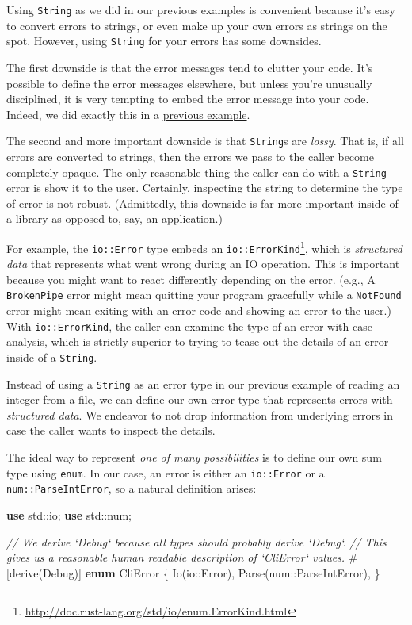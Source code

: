 \documentclass[a4paper,]{book}
\newenvironment{Shaded}{\begin{snugshade}}{\end{snugshade}}
\newcommand{\KeywordTok}[1]{\textcolor[rgb]{0.13,0.29,0.53}{\textbf{{#1}}}}
\newcommand{\CommentTok}[1]{\textcolor[rgb]{0.56,0.35,0.01}{\textit{{#1}}}}
\newcommand{\BuiltInTok}[1]{{#1}}
\newcommand{\AttributeTok}[1]{\textcolor[rgb]{0.77,0.63,0.00}{{#1}}}
\newcommand{\NormalTok}[1]{{#1}}
\renewcommand{\href}[2]{#2\footnote{\url{#1}}}
\begin{document}
Using \texttt{String} as we did in our previous examples is convenient
because it's easy to convert errors to strings, or even make up your own
errors as strings on the spot. However, using \texttt{String} for your
errors has some downsides.

The first downside is that the error messages tend to clutter your code.
It's possible to define the error messages elsewhere, but unless you're
unusually disciplined, it is very tempting to embed the error message
into your code. Indeed, we did exactly this in a
\protect\hyperlink{code-error-double-string}{previous example}.

The second and more important downside is that \texttt{String}s are
\emph{lossy}. That is, if all errors are converted to strings, then the
errors we pass to the caller become completely opaque. The only
reasonable thing the caller can do with a \texttt{String} error is show
it to the user. Certainly, inspecting the string to determine the type
of error is not robust. (Admittedly, this downside is far more important
inside of a library as opposed to, say, an application.)

For example, the \texttt{io::Error} type embeds an
\href{http://doc.rust-lang.org/std/io/enum.ErrorKind.html}{\texttt{io::ErrorKind}},
which is \emph{structured data} that represents what went wrong during
an IO operation. This is important because you might want to react
differently depending on the error. (e.g., A \texttt{BrokenPipe} error
might mean quitting your program gracefully while a \texttt{NotFound}
error might mean exiting with an error code and showing an error to the
user.) With \texttt{io::ErrorKind}, the caller can examine the type of
an error with case analysis, which is strictly superior to trying to
tease out the details of an error inside of a \texttt{String}.

Instead of using a \texttt{String} as an error type in our previous
example of reading an integer from a file, we can define our own error
type that represents errors with \emph{structured data}. We endeavor to
not drop information from underlying errors in case the caller wants to
inspect the details.

The ideal way to represent \emph{one of many possibilities} is to define
our own sum type using \texttt{enum}. In our case, an error is either an
\texttt{io::Error} or a \texttt{num::ParseIntError}, so a natural
definition arises:

\begin{Shaded}
\begin{Highlighting}[]
\KeywordTok{use} \NormalTok{std::io;}
\KeywordTok{use} \NormalTok{std::num;}

\CommentTok{// We derive `Debug` because all types should probably derive `Debug`.}
\CommentTok{// This gives us a reasonable human readable description of `CliError` values.}
\AttributeTok{#[}\NormalTok{derive}\AttributeTok{(}\BuiltInTok{Debug}\AttributeTok{)]}
\KeywordTok{enum} \NormalTok{CliError \{}
    \NormalTok{Io(io::Error),}
    \NormalTok{Parse(num::ParseIntError),}
\NormalTok{\}}
\end{Highlighting}
\end{Shaded}
\end{document}
